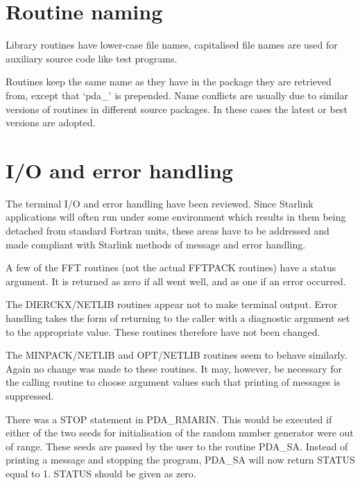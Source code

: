 \documentclass[11pt,twoside]{article}
\newcommand{\xlabel}[1]{}
\begin{document}

\section{\xlabel{routine_naming}Routine naming}

   Library routines have lower-case file names, capitalised file names
   are used for auxiliary source code like test programs.

   Routines keep the same name as they have in the package they are
   retrieved from, except that `pda\_' is prepended. Name conflicts are
   usually due to similar versions of routines in different source
   packages. In these cases the latest or best versions are adopted.


\section{\xlabel{io_and_error_handling}I/O and error handling}

   The terminal I/O and error handling have been reviewed. Since
   Starlink applications will often run under some environment which
   results in them being
   detached from standard Fortran units, these areas have to be
   addressed and made compliant with Starlink methods of message and
   error handling.

   A few of the FFT routines (not the actual FFTPACK routines) have a
   status argument. It is returned as zero if all went well, and as one
   if an error occurred.

   The DIERCKX/NETLIB routines appear not to make terminal output. Error
   handling takes the form of returning to the caller with a diagnostic
   argument set to the appropriate value. These routines therefore have
   not been changed.

   The MINPACK/NETLIB and OPT/NETLIB routines seem to behave similarly.
   Again no change was made to these routines. It may, however, be
   necessary for the calling routine to choose argument values such that
   printing of messages is suppressed.

   There was a STOP statement in PDA\_RMARIN. This would be executed if
   either of the two seeds for initialisation of the random number
   generator were out of range. These seeds are passed by the user to
   the routine PDA\_SA. Instead of printing a message and stopping the
   program, PDA\_SA will now return STATUS equal to 1. STATUS should
   be given as zero.
\end{document}
